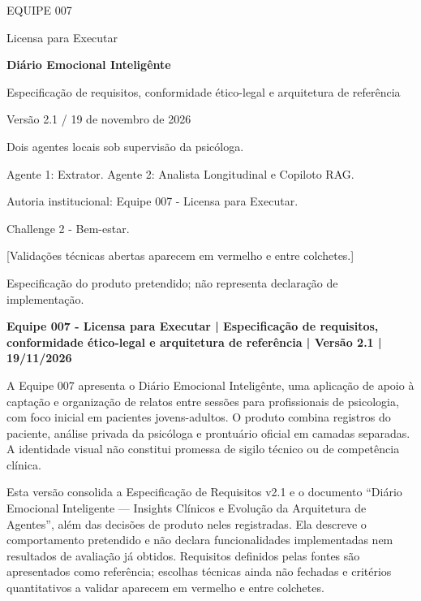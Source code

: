 \documentclass[11pt,a4paper]{article}
\newcommand{\pendencia}[1]{\textcolor{pendente}{[#1]}}
\begin{document}
\begin{titlepage}
\vspace*{25mm}
{\large EQUIPE 007\par}
{\large Licensa para Executar\par}
\vspace{12mm}
{\Huge\bfseries Diário Emocional Inteligênte\par}
\vspace{6mm}
{\LARGE Especificação de requisitos, conformidade ético-legal e arquitetura de referência\par}
\vspace{14mm}
{\large Versão 2.1 / 19 de novembro de 2026\par}
\vspace{8mm}
Dois agentes locais sob supervisão da psicóloga.\par
Agente 1: Extrator. Agente 2: Analista Longitudinal e Copiloto RAG.\par
\vfill
Autoria institucional: Equipe 007 - Licensa para Executar.\par
Challenge 2 - Bem-estar.\par
\pendencia{Validações técnicas abertas aparecem em vermelho e entre colchetes.}\par
Especificação do produto pretendido; não representa declaração de implementação.\par
\end{titlepage}
\tableofcontents
\newpage
\textbf{Equipe 007 - Licensa para Executar | Especificação de requisitos, conformidade ético-legal e arquitetura de referência | Versão 2.1 | 19/11/2026}

A Equipe 007 apresenta o Diário Emocional Inteligênte, uma aplicação de apoio à captação e organização de relatos entre sessões para profissionais de psicologia, com foco inicial em pacientes jovens-adultos. O produto combina registros do paciente, análise privada da psicóloga e prontuário oficial em camadas separadas. A identidade visual não constitui promessa de sigilo técnico ou de competência clínica.

Esta versão consolida a Especificação de Requisitos v2.1 e o documento “Diário Emocional Inteligente — Insights Clínicos e Evolução da Arquitetura de Agentes”, além das decisões de produto neles registradas. Ela descreve o comportamento pretendido e não declara funcionalidades implementadas nem resultados de avaliação já obtidos. Requisitos definidos pelas fontes são apresentados como referência; escolhas técnicas ainda não fechadas e critérios quantitativos a validar aparecem em vermelho e entre colchetes.
\end{document}
